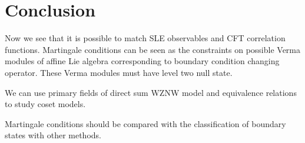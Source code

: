 \documentclass[a4paper]{jpconf}
\theoremstyle{definition}
\theoremstyle{definition} \newtheorem{Def}{Definition}
\begin{document}
\section{Conclusion}
\label{sec:conclusion}

Now we see that it is possible to match SLE observables and CFT correlation functions. Martingale conditions can be seen as the constraints on possible Verma modules of affine Lie algebra corresponding to boundary condition changing operator. These Verma modules must have level two null state. 

We can use primary fields of direct sum WZNW model and equivalence relations to study coset models. 

Martingale conditions should be compared with the classification of boundary states with other methods.

{}

\end{document}
